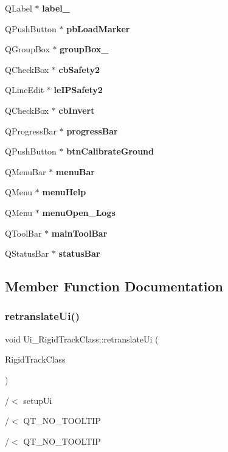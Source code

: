 \begin{DoxyCompactItemize}
\item 
Q\+Label $\ast$ \textbf{ label\+\_}
\item 
Q\+Push\+Button $\ast$ \textbf{ pb\+Load\+Marker}
\item 
Q\+Group\+Box $\ast$ \textbf{ group\+Box\+\_}
\item 
Q\+Check\+Box $\ast$ \textbf{ cb\+Safety2}
\item 
Q\+Line\+Edit $\ast$ \textbf{ le\+I\+P\+Safety2}
\item 
Q\+Check\+Box $\ast$ \textbf{ cb\+Invert}
\item 
Q\+Progress\+Bar $\ast$ \textbf{ progress\+Bar}
\item 
Q\+Push\+Button $\ast$ \textbf{ btn\+Calibrate\+Ground}
\item 
Q\+Menu\+Bar $\ast$ \textbf{ menu\+Bar}
\item 
Q\+Menu $\ast$ \textbf{ menu\+Help}
\item 
Q\+Menu $\ast$ \textbf{ menu\+Open\+\_\+\+Logs}
\item 
Q\+Tool\+Bar $\ast$ \textbf{ main\+Tool\+Bar}
\item 
Q\+Status\+Bar $\ast$ \textbf{ status\+Bar}
\end{DoxyCompactItemize}


\subsection{Member Function Documentation}
\mbox{\label{class_ui___rigid_track_class_a7c96951c4e173848e7695d6bd7883af6}} 
\subsubsection{retranslate\+Ui()}
{\footnotesize\ttfamily void Ui\+\_\+\+Rigid\+Track\+Class\+::retranslate\+Ui (\begin{DoxyParamCaption}\item[{Q\+Main\+Window $\ast$}]{Rigid\+Track\+Class }\end{DoxyParamCaption})\hspace{0.3cm}{\ttfamily [inline]}}



/$<$ setup\+Ui 

/$<$ Q\+T\+\_\+\+N\+O\+\_\+\+T\+O\+O\+L\+T\+IP

/$<$ Q\+T\+\_\+\+N\+O\+\_\+\+T\+O\+O\+L\+T\+IP


